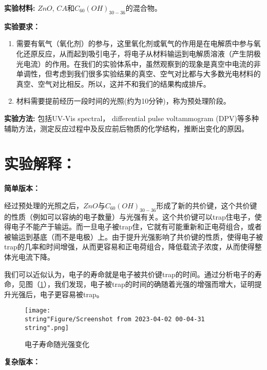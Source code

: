 \documentclass[english]{ctexart}
\begin{document}
\textbf{实验材料:} $ZnO$, $CA$和$C_{60}(OH)_{30-36}$的混合物。

\textbf{实验要求：}
\begin{enumerate}
\item 需要有氧气（氧化剂）的参与，这里氧化剂或氧气的作用是在电解质中参与氧化还原反应，从而起到吸引电子，将电子从材料输运到电解质溶液（产生阴极光电流）的作用。在我们的实验体系中，虽然观察到的现象是真空中电流的非单调性，但考虑到我们很多实验结果的真空、空气对比都与大多数光电材料的真空、空气对比相反。所以，这并不和我们的结果构成排斥。
\item 材料需要提前经历一段时间的光照(约为10分钟)，称为预处理阶段。
\end{enumerate}
\textbf{实验方法: }包括UV-Vis spectral， differential pulse voltammogram
(DPV)等多种辅助方法，测定反应过程中及反应前后物质的化学结构，推断出变化的原因。

\section{实验解释：}

\textbf{简单版本：}

经过预处理的光照之后，$ZnO$与$C_{60}(OH)_{30-36}$形成了新的共价键，这个共价键的性质（例如可以容纳的电子数量）与光强有关。这个共价键可以trap住电子，使得电子不能产于输运。而一旦电子被trap住，它就有可能重新和正电荷组合，或者被输运到基底（而不是电极）上。由于提升光强影响了共价键的性质，使得电子被trap的几率和时间增强，从而更容易和正电荷组合，降低载流子浓度，从而使得整体光电流下降。

我们可以近似认为，电子的寿命就是电子被共价键trap的时间。通过分析电子的寿命，见图（\ref{fig2}），我们发现，电子被trap的时间的确随着光强的增强而增大，证明提升光强后，电子更容易被trap。

\begin{figure}
\texttt{[image: \\string"Figure/Screenshot from 2023-04-02 00-04-31\\string".png]}

\caption{电子寿命随光强变化}

\label{fig2}
\end{figure}

\textbf{复杂版本：}
\end{document}
